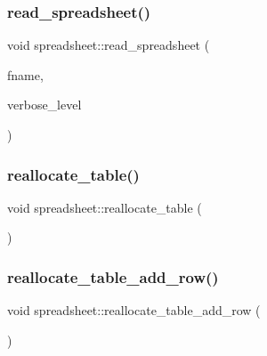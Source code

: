 \mbox{\label{classspreadsheet_a83fe5093941eaa79509b66a7f235d6aa}} 
\subsubsection{\texorpdfstring{read\+\_\+spreadsheet()}{read\_spreadsheet()}}
{\footnotesize\ttfamily void spreadsheet\+::read\+\_\+spreadsheet (\begin{DoxyParamCaption}\item[{const \mbox{\hyperlink{galois_8h_ab6cc7b4aeb6ea31aba2b3fbfc83ff5e6}{B\+Y\+TE}} $\ast$}]{fname,  }\item[{\mbox{\hyperlink{galois_8h_a09fddde158a3a20bd2dcadb609de11dc}{I\+NT}}}]{verbose\+\_\+level }\end{DoxyParamCaption})}

\mbox{\label{classspreadsheet_a4422ede910f726e38b35548794152f62}} 
\subsubsection{\texorpdfstring{reallocate\+\_\+table()}{reallocate\_table()}}
{\footnotesize\ttfamily void spreadsheet\+::reallocate\+\_\+table (\begin{DoxyParamCaption}{ }\end{DoxyParamCaption})}

\mbox{\label{classspreadsheet_a5538f9ac245f978199f4f940adb050b9}} 
\subsubsection{\texorpdfstring{reallocate\+\_\+table\+\_\+add\+\_\+row()}{reallocate\_table\_add\_row()}}
{\footnotesize\ttfamily void spreadsheet\+::reallocate\+\_\+table\+\_\+add\+\_\+row (\begin{DoxyParamCaption}{ }\end{DoxyParamCaption})}

